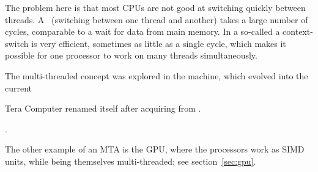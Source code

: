 The problem here is that most CPUs are not good
at switching quickly between threads. A~
(switching between one thread and another) takes a large number of
cycles, comparable to a wait for data from main memory. In a so-called
 a context-switch is very efficient, sometimes as little
as a single
cycle, which makes it possible for one processor to work on many
threads simultaneously.

The multi-threaded concept was explored in the  machine, which evolved into the current
\begin{footnoteenv}
{Tera Computer renamed itself
   after acquiring  from
  .}
  \end{footnoteenv}%
  .

The other example of an \ac{MTA} is the \ac{GPU}, where the processors
work as \ac{SIMD} units, while being themselves multi-threaded; see
section~\ref{sec:gpu}.

